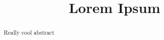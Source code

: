 \documentclass[sigplan,nonacm]{acmart}
\begin{document}
\title{Lorem Ipsum}

\begin{abstract}
    Really cool abstract
\end{abstract}
\maketitle %






\end{document}
